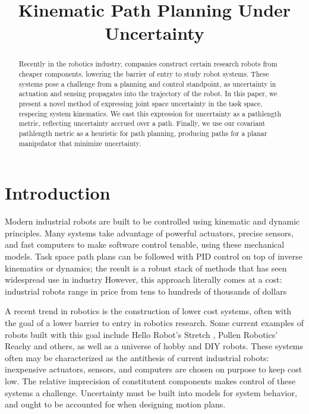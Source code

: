 \documentclass[10pt,conference]{ieeeconf}
\title{Kinematic Path Planning Under Uncertainty}
\author{
    \authorblockN{
        Capprin Bass\IEEEauthorrefmark{1},
        Neha Pusalkar\IEEEauthorrefmark{2}, and
        Brett Stoddard\IEEEauthorrefmark{3}
    }
    \authorblockA{  
        Collaborative Institute for Robotics and Intelligent Systems (CoRIS),
        Oregon State University\\Corvallis, Oregon \\
        Email: \{\IEEEauthorrefmark{1}basscap,
        \IEEEauthorrefmark{2}pusalkan,
        \IEEEauthorrefmark{3}stoddabr\}@oregonstate.edu
    }
}
\begin{document}
\maketitle

\begin{abstract}
    Recently in the robotics industry, companies construct certain research robots from cheaper components, lowering the barrier of entry to study robot systems.
	These systems pose a challenge from a planning and control standpoint, as uncertainty in actuation and sensing propagates into the trajectory of the robot.
	In this paper, we present a novel method of expressing joint space uncertainty in the task space, respecing system kinematics.
	We cast this expression for uncertainty as a pathlength metric, reflecting uncertainty accrued over a path.
	Finally, we use our covariant pathlength metric as a heuristic for path planning, producing paths for a planar manipulator that minimize uncertainty.
\end{abstract}

\section{Introduction}\label{sec:introduction}
Modern industrial robots are built to be controlled using kinematic and dynamic principles.
Many systems take advantage of powerful actuators, precise sensors, and fast computers to make software control tenable, using these mechanical models.
Task space path plans can be followed with PID control on top of inverse kinematics or dynamics; the result is a robust stack of methods that has seen widespread use in industry \cite{something?}
However, this approach literally comes at a cost: industrial robots range in price from tens to hundreds of thousands of dollars \cite{pricing}

A recent trend in robotics is the construction of lower cost systems, often with the goal of a lower barrier to entry in robotics research.
Some current examples of robots built with this goal include Hello Robot's Stretch \cite{stretch}, Pollen Robotics' Reachy \cite{reachy} and others, as well as a universe of hobby and DIY robots.
These systems often may be characterized as the antithesis of current industrial robots: inexpensive actuators, sensors, and computers are chosen on purpose to keep cost low.
The relative imprecision of constitutent components makes control of these systems a challenge.
Uncertainty must be built into models for system behavior, and ought to be accounted for when designing motion plans.
\end{document}
